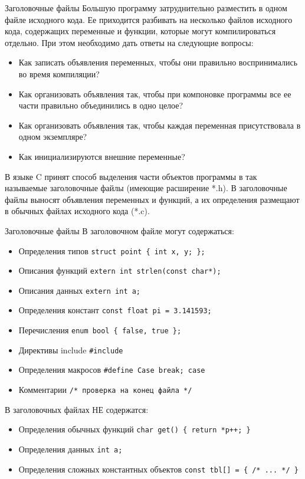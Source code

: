 \documentclass{beamer}
\begin{document}
\begin{frame}{Заголовочные файлы}
    Большую программу затруднительно разместить в одном файле исходного кода. Ее приходится разбивать на несколько файлов исходного кода, содержащих переменные и функции, которые могут компилироваться отдельно. При этом необходимо дать ответы на следующие вопросы:
    
    \begin{itemize}
        \item Как записать объявления переменных, чтобы они правильно воспринимались во время компиляции?
        \item Как организовать объявления так, чтобы при компоновке программы все ее части правильно
        объединились в одно целое?
        \item Как организовать объявления так, чтобы каждая переменная присутствовала в одном экземпляре?
        \item Как инициализируются внешние переменные?
    \end{itemize}
    
    В языке C принят способ выделения части объектов программы в так называемые заголовочные файлы (имеющие расширение *.h). В заголовочные файлы выносят объявления переменных и функций, а их определения размещают в обычных файлах исходного кода (*.c).
\end{frame}

\begin{frame}{Заголовочные файлы}
    В заголовочном файле могут содержаться:
    \begin{itemize}
    \item Определения типов \texttt{struct point \{ int x, y; \};}
    \item Описания функций \texttt{extern int strlen(const char*);}
    \item Описания данных \texttt{extern int a;}
    \item Определения констант \texttt{const float pi = 3.141593;}
    \item Перечисления \texttt{enum bool \{ false, true \};}
    \item Директивы include \texttt{\#include}
    \item Определения макросов \texttt{\#define Case break; case}
    \item Комментарии \texttt{/* проверка на конец файла */}
    \end{itemize}

    В заголовочных файлах НЕ содержатся:
    \begin{itemize}
        \item Определения обычных функций \texttt{char get() \{ return *p++; \}}
        \item Определения данных \texttt{int a;}
        \item Определения сложных константных объектов \texttt{const tbl[] = \{ /* ... */ \}}
    \end{itemize}
    \end{frame}
\end{document}

